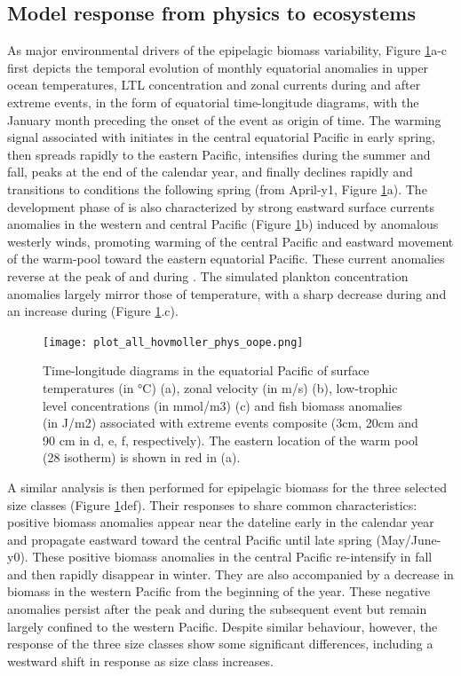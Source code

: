 \subsection{Model response from physics to ecosystems}

As major environmental drivers of the epipelagic biomass variability, Figure \ref{fig:hov_nemo_ape}a-c first depicts the temporal evolution of monthly equatorial anomalies in upper ocean temperatures, LTL concentration and zonal currents during and after extreme \nino{} events, in the form of equatorial time-longitude diagrams, with the January month preceding the onset of the \nino{} event as origin of time. The warming signal associated with \nino{} initiates in the central equatorial Pacific in early spring, then spreads rapidly to the eastern Pacific, intensifies during the summer and fall, peaks at the end of the calendar year, and finally  declines rapidly and transitions to \nina{} conditions the following spring (from April-y1, Figure \ref{fig:hov_nemo_ape}a). The development phase of \nino{} is also characterized by strong eastward surface currents anomalies in the western and central Pacific (Figure \ref{fig:hov_nemo_ape}b) induced by anomalous westerly winds, promoting warming of the central Pacific and eastward movement of the warm-pool toward the eastern equatorial Pacific. These current anomalies reverse at the peak of \nino{} and during \nina{}. The simulated plankton concentration anomalies largely mirror those of temperature, with a sharp decrease during \nino{} and an increase during \nina{} (Figure \ref{fig:hov_nemo_ape}.c). 

\begin{figure}[h!tp]
	\centering
	\texttt{[image: plot\_all\_hovmoller\_phys\_oope.png]}	
	\caption{Time-longitude diagrams in the equatorial Pacific of surface temperatures (in °C) (a), zonal velocity (in m/s) (b), low-trophic level concentrations (in mmol/m3) (c) and fish biomass anomalies (in J/m2) associated with extreme \nino{} events composite (3cm, 20cm and 90 cm in d, e, f, respectively). The eastern location of the warm pool (28\degree{} isotherm) is shown in red in (a).}	
	\label{fig:hov_nemo_ape}
\end{figure}

A similar analysis is then performed for epipelagic biomass for the three selected size classes (Figure \ref{fig:hov_nemo_ape}def). Their responses to \nino{} share common characteristics: positive biomass anomalies appear near the dateline early in the calendar year and propagate eastward toward the central Pacific until late spring (May/June-y0). These positive biomass anomalies in the central Pacific re-intensify in fall and then rapidly disappear in winter. They are also accompanied by a decrease in biomass in the western Pacific from the beginning of the \nino{} year. These negative anomalies persist after the \nino{} peak and during the subsequent \nina{} event but remain largely confined to the western Pacific. Despite similar behaviour, however, the response of the three size classes show some significant differences, including a westward shift in response as size class increases.


